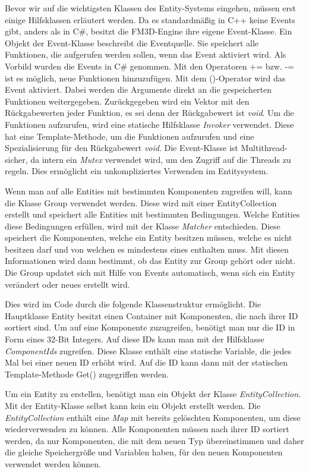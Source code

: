 Bevor wir auf die wichtigsten Klassen des Entity-Systems eingehen, müssen erst einige Hilfsklassen erläutert werden.
Da es standardmäßig in C++ keine Events gibt, anders als in C\#, besitzt die FM3D-Engine ihre eigene Event-Klasse. Ein Objekt der Event-Klasse beschreibt die Eventquelle. Sie speichert alle Funktionen, die aufgerufen werden sollen, wenn das Event aktiviert wird. Als Vorbild wurden die Events in C\# genommen. Mit den Operatoren += bzw. -= ist es möglich, neue Funktionen hinzuzufügen. Mit dem ()-Operator wird das Event aktiviert. Dabei werden die Argumente direkt an die gespeicherten Funktionen weitergegeben. Zurückgegeben wird ein Vektor mit den Rückgabewerten jeder Funktion, es sei denn der Rückgabewert ist \textit{void}. Um die Funktionen aufzurufen, wird eine statische Hilfsklasse \textit{Invoker} verwendet. Diese hat eine Template-Methode, um die Funktionen aufzurufen und eine Spezialisierung für den Rückgabewert \textit{void}. Die Event-Klasse ist Multithread-sicher, da intern ein \textit{Mutex} verwendet wird, um den Zugriff auf die Threads zu regeln. Dies ermöglicht ein %
unkompliziertes Verwenden im Entitysystem.

Wenn man auf alle Entities mit bestimmten Komponenten zugreifen will, kann die Klasse Group verwendet werden. Diese wird mit einer EntityCollection erstellt und speichert alle Entities mit bestimmten Bedingungen. Welche Entities diese Bedingungen erfüllen, wird mit der Klasse \textit{Matcher} entschieden. Diese speichert die Komponenten, welche ein Entity besitzen müssen, welche es nicht besitzen darf und von welchen es mindestens eines enthalten muss. Mit diesen Informationen wird dann bestimmt, ob das Entity zur Group gehört oder nicht. Die Group updatet sich mit Hilfe von Events automatisch, wenn sich ein Entity verändert oder neues erstellt wird.

Dies wird im Code durch die folgende Klassenstruktur ermöglicht. Die Hauptklasse Entity besitzt einen Container mit Komponenten, die nach ihrer ID sortiert sind. Um auf eine Komponente zuzugreifen, benötigt man nur die ID in Form eines 32-Bit Integers. Auf diese IDs kann man mit der Hilfsklasse \textit{ComponentIds} zugreifen. 
Diese Klasse enthält eine statische Variable, die jedes Mal bei einer neuen ID erhöht wird. Auf die ID kann dann mit der statischen Template-Methode Get() zugegriffen werden.
 
Um ein Entity zu erstellen, benötigt man ein Objekt der Klasse \textit{EntityCollection}. Mit der Entity-Klasse selbst kann kein ein Objekt erstellt werden.
Die \textit{EntityCollection} enthält eine \textit{Map} mit bereits gelöschten Komponenten, um diese wiederverwenden zu können. 
Alle Komponenten müssen nach ihrer ID sortiert werden, da nur Komponenten, die mit dem neuen Typ übereinstimmen und daher die gleiche Speichergröße und Variablen haben, für den neuen Komponenten verwendet werden können.

